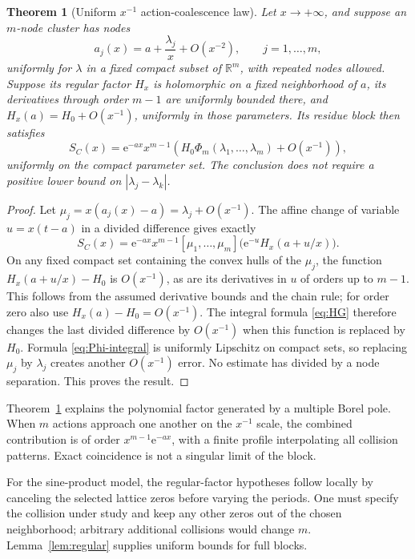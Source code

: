 \documentclass[11pt,a4paper]{article}
\numberwithin{equation}{section}
\newtheorem{theorem}{Theorem}[section]
\theoremstyle{definition}
\theoremstyle{remark}
\newcommand{\e}{\mathrm e}
\newcommand{\R}{\mathbb R}
\begin{document}
\begin{theorem}[Uniform $x^{-1}$ action-coalescence law]
\label{thm:coalescence}
Let $x\to+\infty$, and suppose an $m$-node cluster has nodes
\begin{equation}
 a_j(x)=a+\frac{\lambda_j}{x}+O(x^{-2}),\qquad j=1,\ldots,m,
 \label{eq:movingnodes}
\end{equation}
uniformly for $\lambda$ in a fixed compact subset of $\R^m$, with repeated
nodes allowed. Suppose its regular factor $H_x$ is holomorphic on a
fixed neighborhood of $a$, its derivatives through order $m-1$ are
uniformly bounded there, and $H_x(a)=H_0+O(x^{-1})$, uniformly in those
parameters. Its residue block then satisfies
\begin{equation}
 S_C(x)=\e^{-ax}x^{m-1}
       \left(H_0\Phi_m(\lambda_1,\ldots,\lambda_m)+O(x^{-1})\right),
 \label{eq:coalescence}
\end{equation}
uniformly on the compact parameter set. The conclusion does not require
a positive lower bound on $|\lambda_j-\lambda_k|$.
\end{theorem}
\begin{proof}
Let $\mu_j=x(a_j(x)-a)=\lambda_j+O(x^{-1})$. The affine change of variable
$u=x(t-a)$ in a divided difference gives exactly
\[
 S_C(x)=\e^{-ax}x^{m-1}
 [\mu_1,\ldots,\mu_m]\bigl(\e^{-u}H_x(a+u/x)\bigr).
\]
On any fixed compact set containing the convex hulls of the $\mu_j$,
the function $H_x(a+u/x)-H_0$ is $O(x^{-1})$, as are its derivatives
in $u$ of orders up to $m-1$. This follows from the assumed derivative
bounds and the chain rule; for order zero also use
$H_x(a)-H_0=O(x^{-1})$.
The integral formula \eqref{eq:HG} therefore changes the last divided
difference by $O(x^{-1})$ when this function is replaced by $H_0$.
Formula \eqref{eq:Phi-integral} is uniformly Lipschitz on compact sets,
so replacing $\mu_j$ by $\lambda_j$ creates another $O(x^{-1})$ error.
No estimate has divided by a node separation. This proves the result.
\end{proof}

Theorem~\ref{thm:coalescence} explains the polynomial factor generated by a
multiple Borel pole. When $m$ actions approach one another on the
$x^{-1}$ scale, the combined contribution is of order
$x^{m-1}\e^{-ax}$, with a finite profile interpolating all collision
patterns. Exact coincidence is not a singular limit of the block.

For the sine-product model, the regular-factor hypotheses follow locally
by canceling the selected lattice zeros before varying the periods.
One must specify the collision under study and keep any other zeros out
of the chosen neighborhood; arbitrary additional collisions would change
$m$. Lemma~\ref{lem:regular} supplies uniform bounds for full blocks.
\end{document}
